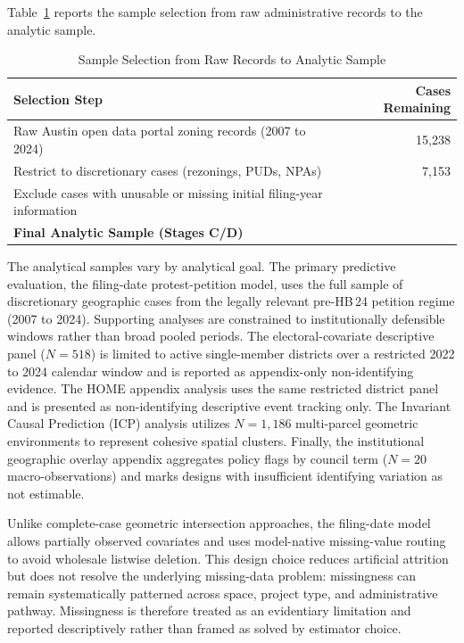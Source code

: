 \documentclass[11pt, letterpaper]{article}
\begin{document}


Table~\ref{tab:attrition} reports the sample selection from raw administrative records to the analytic sample.

\begin{table}[H]
\centering
\caption{Sample Selection from Raw Records to Analytic Sample}
\label{tab:attrition}
\begin{tabular}{l r}
\toprule
\textbf{Selection Step} & \textbf{Cases Remaining} \\
\midrule
Raw Austin open data portal zoning records (2007 to 2024) & 15,238 \\
Restrict to discretionary cases (rezonings, PUDs, NPAs) & 7,153 \\
Exclude cases with unusable or missing initial filing-year information & \metricBaselineCases{} \\
\midrule
\textbf{Final Analytic Sample (Stages C/D)} & \textbf{\metricBaselineCases{}} \\
\bottomrule
\end{tabular}
\end{table}

The analytical samples vary by analytical goal. The primary predictive evaluation, the filing-date protest-petition model, uses the full sample of \metricBaselineCases{} discretionary geographic cases from the legally relevant pre-HB\,24 petition regime (2007 to 2024). Supporting analyses are constrained to institutionally defensible windows rather than broad pooled periods. The electoral-covariate descriptive panel ($N=518$) is limited to active single-member districts over a restricted 2022 to 2024 calendar window and is reported as appendix-only non-identifying evidence. The HOME appendix analysis uses the same restricted district panel and is presented as non-identifying descriptive event tracking only. The Invariant Causal Prediction (ICP) analysis utilizes $N=1,186$ multi-parcel geometric environments to represent cohesive spatial clusters. Finally, the institutional geographic overlay appendix aggregates policy flags by council term ($N=20$ macro-observations) and marks designs with insufficient identifying variation as not estimable.

Unlike complete-case geometric intersection approaches, the filing-date model allows partially observed covariates and uses model-native missing-value routing to avoid wholesale listwise deletion. This design choice reduces artificial attrition but does not resolve the underlying missing-data problem: missingness can remain systematically patterned across space, project type, and administrative pathway. Missingness is therefore treated as an evidentiary limitation and reported descriptively rather than framed as solved by estimator choice.
\end{document}

